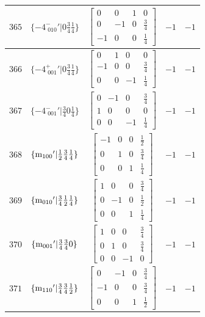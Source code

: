 \documentclass[fleqn,8pt]{jsarticle}
\begin{document}
\begin{longtable}{ccccc}
$ 365 $ & $ \{-4^{-}_{\,\,010}{}'|0 \frac{3}{4} \frac{1}{4}\} $ & $ \begin{bmatrix} 0 & 0 & 1 & 0 \\ 0 & -1 & 0 & \frac{3}{4} \\ -1 & 0 & 0 & \frac{1}{4} \end{bmatrix} $ & $ -1 $ & $ -1 $ \\ \hline
$ 366 $ & $ \{-4^{+}_{\,\,001}{}'|0 \frac{3}{4} \frac{1}{4}\} $ & $ \begin{bmatrix} 0 & 1 & 0 & 0 \\ -1 & 0 & 0 & \frac{3}{4} \\ 0 & 0 & -1 & \frac{1}{4} \end{bmatrix} $ & $ -1 $ & $ -1 $ \\ \hline
$ 367 $ & $ \{-4^{-}_{\,\,001}{}'|\frac{3}{4} 0 \frac{1}{4}\} $ & $ \begin{bmatrix} 0 & -1 & 0 & \frac{3}{4} \\ 1 & 0 & 0 & 0 \\ 0 & 0 & -1 & \frac{1}{4} \end{bmatrix} $ & $ -1 $ & $ -1 $ \\ \hline
$ 368 $ & $ \{{\rm m}_{100}{}'|\frac{1}{2} \frac{3}{4} \frac{1}{4}\} $ & $ \begin{bmatrix} -1 & 0 & 0 & \frac{1}{2} \\ 0 & 1 & 0 & \frac{3}{4} \\ 0 & 0 & 1 & \frac{1}{4} \end{bmatrix} $ & $ -1 $ & $ -1 $ \\ \hline
$ 369 $ & $ \{{\rm m}_{010}{}'|\frac{3}{4} \frac{1}{2} \frac{1}{4}\} $ & $ \begin{bmatrix} 1 & 0 & 0 & \frac{3}{4} \\ 0 & -1 & 0 & \frac{1}{2} \\ 0 & 0 & 1 & \frac{1}{4} \end{bmatrix} $ & $ -1 $ & $ -1 $ \\ \hline
$ 370 $ & $ \{{\rm m}_{001}{}'|\frac{3}{4} \frac{3}{4} 0\} $ & $ \begin{bmatrix} 1 & 0 & 0 & \frac{3}{4} \\ 0 & 1 & 0 & \frac{3}{4} \\ 0 & 0 & -1 & 0 \end{bmatrix} $ & $ -1 $ & $ -1 $ \\ \hline
$ 371 $ & $ \{{\rm m}_{110}{}'|\frac{3}{4} \frac{3}{4} \frac{1}{2}\} $ & $ \begin{bmatrix} 0 & -1 & 0 & \frac{3}{4} \\ -1 & 0 & 0 & \frac{3}{4} \\ 0 & 0 & 1 & \frac{1}{2} \end{bmatrix} $ & $ -1 $ & $ -1 $ \\ \hline

\end{longtable}
\end{document}
